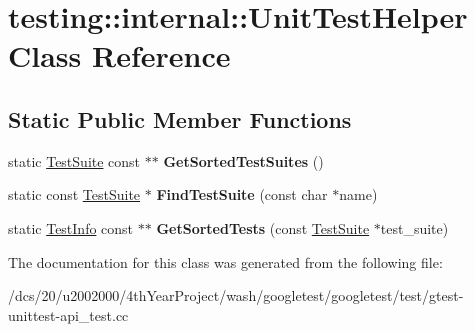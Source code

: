 \hypertarget{classtesting_1_1internal_1_1UnitTestHelper}{}\section{testing\+:\+:internal\+:\+:Unit\+Test\+Helper Class Reference}
\label{classtesting_1_1internal_1_1UnitTestHelper}
\subsection*{Static Public Member Functions}
\begin{DoxyCompactItemize}
\item 
\mbox{\label{classtesting_1_1internal_1_1UnitTestHelper_a5704cd10fdef526c4c541fc53a24ed41}} 
static \mbox{\hyperlink{classtesting_1_1TestSuite}{Test\+Suite}} const  $\ast$$\ast$ {\bfseries Get\+Sorted\+Test\+Suites} ()
\item 
\mbox{\label{classtesting_1_1internal_1_1UnitTestHelper_a1e95da834922a2ebcf33a7ee73f17757}} 
static const \mbox{\hyperlink{classtesting_1_1TestSuite}{Test\+Suite}} $\ast$ {\bfseries Find\+Test\+Suite} (const char $\ast$name)
\item 
\mbox{\label{classtesting_1_1internal_1_1UnitTestHelper_a54bff33b585ae04423ddd959ebfc0b90}} 
static \mbox{\hyperlink{classtesting_1_1TestInfo}{Test\+Info}} const  $\ast$$\ast$ {\bfseries Get\+Sorted\+Tests} (const \mbox{\hyperlink{classtesting_1_1TestSuite}{Test\+Suite}} $\ast$test\+\_\+suite)
\end{DoxyCompactItemize}


The documentation for this class was generated from the following file\+:\begin{DoxyCompactItemize}
\item 
/dcs/20/u2002000/4th\+Year\+Project/wash/googletest/googletest/test/gtest-\/unittest-\/api\+\_\+test.\+cc\end{DoxyCompactItemize}

